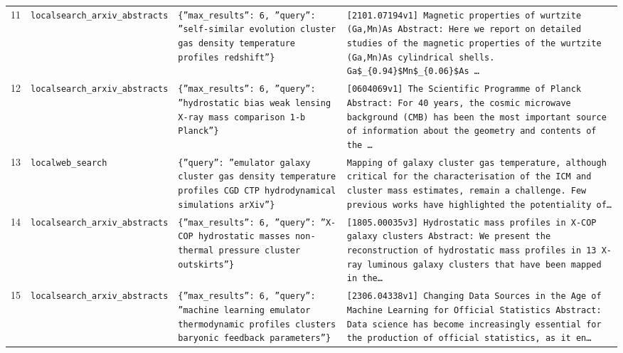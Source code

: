 \documentclass[11pt,a4paper]{article}
\begin{document}
\begin{longtable}{@{}p{}p{}p{}p{}@{}}
11 & \texttt{local}\newline\texttt{search\_\allowbreak{}arxiv\_\allowbreak{}abstracts} & \texttt{\{''max\_\allowbreak{}results'':\allowbreak{} 6,\allowbreak{} ''query'':\allowbreak{} ''self-similar evolution cluster gas density temperature profiles redshift''\}\allowbreak{}} & \texttt{[2101.07194v1]\allowbreak{} Magnetic properties of wurtzite (Ga,\allowbreak{}Mn)\allowbreak{}As Abstract:\allowbreak{} Here we report on detailed studies of the magnetic properties of the wurtzite (Ga,\allowbreak{}Mn)\allowbreak{}As cylindrical shells. Ga\$\_\allowbreak{}\{0.94\}\allowbreak{}\$Mn\$\_\allowbreak{}\{0.06\}\allowbreak{}\$As \ldots{}\allowbreak{}} \\
12 & \texttt{local}\newline\texttt{search\_\allowbreak{}arxiv\_\allowbreak{}abstracts} & \texttt{\{''max\_\allowbreak{}results'':\allowbreak{} 6,\allowbreak{} ''query'':\allowbreak{} ''hydrostatic bias weak lensing X-ray mass comparison 1-b Planck''\}\allowbreak{}} & \texttt{[0604069v1]\allowbreak{} The Scientific Programme of Planck Abstract:\allowbreak{}   For 40 years,\allowbreak{} the cosmic microwave background (CMB)\allowbreak{} has been the most important source of information about the geometry and contents of the \ldots{}\allowbreak{}} \\
13 & \texttt{local}\newline\texttt{web\_\allowbreak{}search} & \texttt{\{''query'':\allowbreak{} ''emulator galaxy cluster gas density temperature profiles CGD CTP hydrodynamical simulations arXiv''\}\allowbreak{}} & \texttt{Mapping of galaxy cluster gas temperature,\allowbreak{} although critical for the characterisation of the ICM and cluster mass estimates,\allowbreak{} remain a challenge. Few previous works have highlighted the potentiality of\ldots{}\allowbreak{}} \\
14 & \texttt{local}\newline\texttt{search\_\allowbreak{}arxiv\_\allowbreak{}abstracts} & \texttt{\{''max\_\allowbreak{}results'':\allowbreak{} 6,\allowbreak{} ''query'':\allowbreak{} ''X-COP hydrostatic masses non-thermal pressure cluster outskirts''\}\allowbreak{}} & \texttt{[1805.00035v3]\allowbreak{} Hydrostatic mass profiles in X-COP galaxy clusters Abstract:\allowbreak{} We present the reconstruction of hydrostatic mass profiles in 13 X-ray luminous galaxy clusters that have been mapped in the\ldots{}\allowbreak{}} \\
15 & \texttt{local}\newline\texttt{search\_\allowbreak{}arxiv\_\allowbreak{}abstracts} & \texttt{\{''max\_\allowbreak{}results'':\allowbreak{} 6,\allowbreak{} ''query'':\allowbreak{} ''machine learning emulator thermodynamic profiles clusters baryonic feedback parameters''\}\allowbreak{}} & \texttt{[2306.04338v1]\allowbreak{} Changing Data Sources in the Age of Machine Learning for Official Statistics Abstract:\allowbreak{} Data science has become increasingly essential for the production of official statistics,\allowbreak{} as it en\ldots{}\allowbreak{}} \\

\end{longtable}
\end{document}
